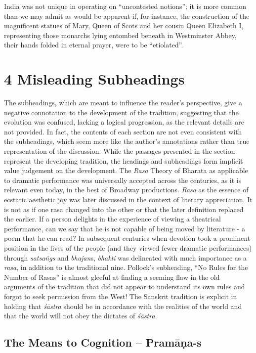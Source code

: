 India was not unique in operating on “uncontested notions”; it is more common than we may admit as would be apparent if, for instance, the construction of the magnificent statues of Mary, Queen of Scots and her cousin Queen Elizabeth I, representing those monarchs lying entombed beneath in Westminster Abbey, their hands folded in eternal prayer, were to be “etiolated”.


\section*{4 Misleading Subheadings}

The subheadings, which are meant to influence the reader’s perspective, give a negative connotation to the development of the tradition, suggesting that the evolution was confused, lacking a logical progression, as the relevant details are not provided. In fact, the contents of each section are not even consistent with the subheadings, which seem more like the author’s annotations rather than true representation of the discussion. While the passages presented in the section represent the developing tradition, the headings and subheadings form implicit value judgement on the development. The \textit{Rasa} Theory of Bharata as applicable to dramatic performance was universally accep\-ted across the centuries, as it is relevant even today, in the best of Broadway productions. \textit{Rasa} as the essence of ecstatic aesthetic joy was later discussed in the context of literary appreciation. It is not as if one rasa changed into the other or that the later definition replaced the earlier. If a person delights in the experience of viewing a theatrical performance, can we say that he is not capable of being moved by literature - a poem that he can read? In subsequent centuries when devotion took a prominent position in the lives of the people (and they viewed fewer dramatic performances) through \textit{satsaṅgs} and \textit{bhajan}s, \textit{bhakti} was delineated with much importance as a \textit{rasa}, in addition to the traditional nine. Pollock’s subheading, “No Rules for the Number of Rasas” is almost gleeful at finding a seeming flaw in the old arguments of the tradition that did not appear to understand its own rules and forgot to seek permission from the West! The Sanskrit tradition is explicit in holding that \textit{śāstra} should be in accordance with the realities of the world and that the world will not obey the dictates of \textit{śāstra}.

\subsection*{The Means to Cognition – Pramāṇa-s}

